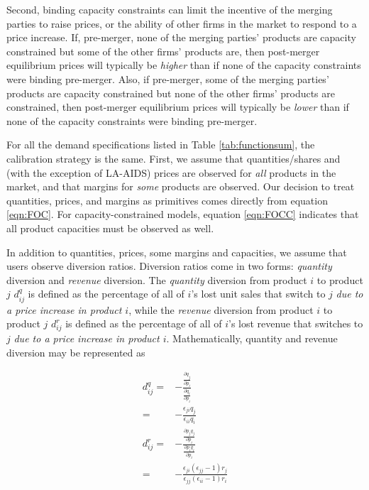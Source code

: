\documentclass[11pt,numbers=noenddot,pointlessnumbers]{scrreprt}
\numberwithin{equation}{section}
\begin{document}
Second, binding capacity constraints can limit the incentive of the
merging parties to raise prices, or the ability of other firms in the
market to respond to a price increase. If, pre-merger, none of the
merging parties' products are capacity constrained but some of the
other firms' products are, then post-merger equilibrium prices will
typically be \emph{higher} than if none of the capacity constraints were
binding pre-merger. Also, if pre-merger, some of the merging parties'
products are capacity constrained but none of the other firms' products
are constrained, then post-merger equilibrium prices will typically be
\emph{lower} than if none of the capacity constraints were binding pre-merger.



For all the demand specifications listed in Table
\ref{tab:functionsum}, the calibration strategy is the same. First, we
assume that quantities/shares and (with the exception of LA-AIDS) prices are observed for \emph{all} products in the
market, and that margins for \emph{some} products
are observed. Our decision to treat quantities, prices, and
margins as primitives comes directly from equation
\ref{eqn:FOC}. For capacity-constrained models, equation
\ref{eqn:FOCC} indicates that all product capacities must be observed
as well.

In addition to quantities, prices, some margins and capacities, we assume that
users observe diversion ratios. Diversion ratios come in two
forms: \emph{quantity} diversion and \emph{revenue} diversion. The
\emph{quantity} diversion from
product $i$ to product $j$ $d^q_{ij}$ is defined as the percentage of all of $i$'s
lost unit sales that switch to $j$ \emph{due to a price increase in
  product $i$}, while the \emph{revenue} diversion  from
product $i$ to product $j$ $d^r_{ij}$ is  defined as the percentage of all of $i$'s
lost revenue that switches to $j$ \emph{due to a price increase in
  product $i$}. Mathematically, quantity and revenue diversion may be
represented as

\begin{align}
  \label{eqn:divquant}
d^q_{ij}=&-\frac{\frac{\partial q_j}{\partial p_i}}{\frac{\partial
    \nonumber q_i}{\partial p_i}}\\ =& -\frac{\epsilon_{ji}q_j}{\epsilon_{ii}q_i}\\
  \label{eqn:divrev}
d^r_{ij}=&-\frac{\frac{\partial p_jq_j}{\partial p_i}}{\frac{\partial
    \nonumber p_iq_i}{\partial p_i}} \\ =&-\frac{\epsilon_{ji}(\epsilon_{jj}-1)r_j}{\epsilon_{jj}(\epsilon_{ii}-1)r_i}
\end{align}
\end{document}
